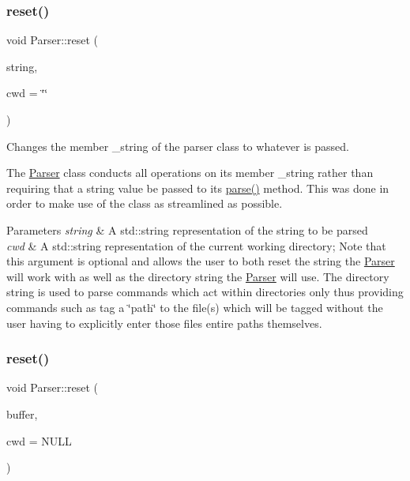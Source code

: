 \subsubsection{\texorpdfstring{reset()}{reset()}\hspace{0.1cm}{\footnotesize\ttfamily [1/3]}}
{\footnotesize\ttfamily void Parser\+::reset (\begin{DoxyParamCaption}\item[{std\+::string}]{string,  }\item[{std\+::string}]{cwd = {\ttfamily \char`\"{}\char`\"{}} }\end{DoxyParamCaption})}



Changes the member \+\_\+string of the parser class to whatever is passed. 

The \mbox{\hyperlink{classParser}{Parser}} class conducts all operations on its member \+\_\+string rather than requiring that a string value be passed to its \mbox{\hyperlink{classParser_a5b531e9ed867eeb8ccb9cb088cf35c24}{parse()}} method. This was done in order to make use of the class as streamlined as possible.


\begin{DoxyParams}{Parameters}
{\em string} & A std\+::string representation of the string to be parsed\\
\hline
{\em cwd} & A std\+::string representation of the current working directory; Note that this argument is optional and allows the user to both reset the string the \mbox{\hyperlink{classParser}{Parser}} will work with as well as the directory string the \mbox{\hyperlink{classParser}{Parser}} will use. The directory string is used to parse commands which act within directories only thus providing commands such as \textquotesingle{}tag\textquotesingle{} a \char`\"{}path\char`\"{} to the file(s) which will be tagged without the user having to explicitly enter those file\textquotesingle{}s entire paths themselves. \\
\hline
\end{DoxyParams}
\mbox{\label{classParser_a5e097c301e171481e8d2af91c112e35e}} 
\subsubsection{\texorpdfstring{reset()}{reset()}\hspace{0.1cm}{\footnotesize\ttfamily [2/3]}}
{\footnotesize\ttfamily void Parser\+::reset (\begin{DoxyParamCaption}\item[{char $\ast$}]{buffer,  }\item[{char $\ast$}]{cwd = {\ttfamily NULL} }\end{DoxyParamCaption})}



